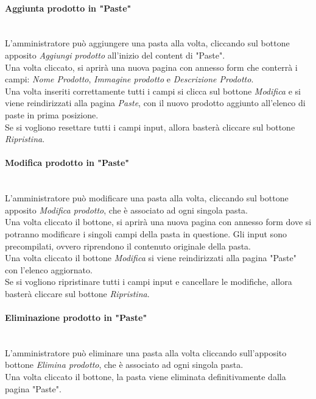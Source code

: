 \paragraph{Aggiunta prodotto in "Paste"}\mbox{}\\
\label{par:AddP}
L'amministratore può aggiungere una pasta alla volta, cliccando sul bottone apposito \emph{Aggiungi prodotto} all'inizio del content di "Paste".\\ 
Una volta cliccato, si aprirà una nuova pagina con annesso form che conterrà i campi: \emph{Nome Prodotto}, \emph{Immagine prodotto} e \emph{Descrizione Prodotto}.\\ 
Una volta inseriti correttamente tutti i campi si clicca sul bottone \emph{Modifica} e si viene reindirizzati alla pagina \emph{Paste}, con il nuovo prodotto 
aggiunto all'elenco di paste in prima posizione.\\
Se si vogliono resettare tutti i campi input, allora basterà cliccare sul bottone \emph{Ripristina}.

\paragraph{Modifica prodotto in "Paste"}\mbox{}\\
\label{par:ModP}
L'amministratore può modificare una pasta alla volta, cliccando sul bottone apposito \emph{Modifica prodotto}, che è associato ad ogni singola pasta.\\ 
Una volta cliccato il bottone, si aprirà una nuova pagina con annesso form dove si potranno modificare i singoli campi della pasta in questione. 
Gli input sono precompilati, ovvero riprendono il contenuto originale della pasta.\\
Una volta cliccato il bottone \emph{Modifica} si viene reindirizzati alla pagina "Paste" con l'elenco aggiornato.\\
Se si vogliono ripristinare tutti i campi input e cancellare le modifiche, allora basterà cliccare sul bottone \emph{Ripristina}.

\paragraph{Eliminazione prodotto in "Paste"}\mbox{}\\
\label{par:DelP}
L'amministratore può eliminare una pasta alla volta cliccando sull'apposito bottone \emph{Elimina prodotto}, che è associato ad ogni singola pasta.\\ 
Una volta cliccato il bottone, la pasta viene eliminata definitivamente dalla pagina "Paste".\\

